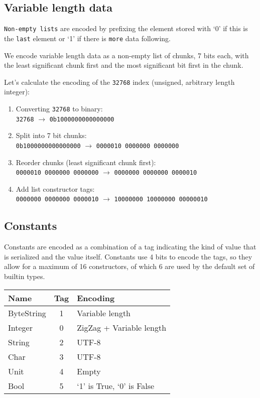 \documentclass[a4paper]{article}
\newcommand\sep{4pt}
\newcommand{\Strut}{\rule[-2mm]{0mm}{6mm}}
\begin{document}
\begin{appendices}
\subsection{Variable length data}

\texttt{Non-empty lists} are encoded by prefixing the element stored with `0'
if this is the \texttt{last} element or `1' if there is \texttt{more} data following.

\noindent We encode variable length data as a non-empty list of chunks, 7 bits each,
with the least significant chunk first and the most significant bit first in the chunk.

\medskip
\noindent Let's calculate the encoding of the \texttt{32768} index (unsigned, arbitrary
length integer):
\begin{enumerate}
  \item Converting \texttt{32768} to binary: \\
    \verb|32768| $\rightarrow$ \verb|0b1000000000000000|
  \item Split into 7 bit chunks: \\
    \verb|0b1000000000000000| $\rightarrow$ \verb|0000010 0000000 0000000|
  \item Reorder chunks (least significant chunk first): \\
    \verb|0000010 0000000 0000000| $\rightarrow$ \verb|0000000 0000000 0000010|
  \item Add list constructor tags: \\
    \verb|0000000 0000000 0000010| $\rightarrow$ \verb|10000000 10000000 00000010|
\end{enumerate}

\subsection{Constants}

Constants are encoded as a combination of a tag indicating the kind of value that is serialized and the
value itself. Constants use 4 bits to encode the tags, so they allow for a
maximum of 16 constructors, of which 6 are used by the default set of builtin types.

\vspace{1cm}

\begin{minipage}{\linewidth}
\centering
\begin{tabular}{|l|c|l|}
  \hline
  \Strut
  \textrm{Name} & \textrm{Tag} & \textrm{Encoding} \\
  \hline
  ByteString & 1 & Variable length \rule{0mm}{4mm} \\[\sep]
  Integer & 0 & ZigZag + Variable length \\[\sep]
  String & 2 & UTF-8 \\[\sep]
  Char & 3 & UTF-8 \\[\sep]
  Unit & 4 & Empty \\[\sep]
  Bool & 5 & `1' is True, `0' is False \\[\sep]
  \hline
\end{tabular}
\label{fig:serialisation-constants}
\end{minipage}


\end{appendices}
\end{document}
